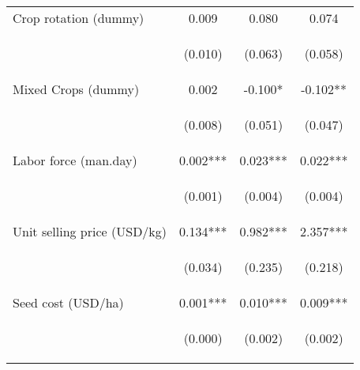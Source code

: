 \begin{center}
\begin{tabular}{lccc}
Crop rotation (dummy) & 0.009 & 0.080 & 0.074 \\
\vspace{4pt} & \begin{footnotesize}(0.010)\end{footnotesize} & \begin{footnotesize}(0.063)\end{footnotesize} & \begin{footnotesize}(0.058)\end{footnotesize} \\
Mixed Crops (dummy) & 0.002 & -0.100* & -0.102** \\
\vspace{4pt} & \begin{footnotesize}(0.008)\end{footnotesize} & \begin{footnotesize}(0.051)\end{footnotesize} & \begin{footnotesize}(0.047)\end{footnotesize} \\
Labor force (man.day) & 0.002*** & 0.023*** & 0.022*** \\
\vspace{4pt} & \begin{footnotesize}(0.001)\end{footnotesize} & \begin{footnotesize}(0.004)\end{footnotesize} & \begin{footnotesize}(0.004)\end{footnotesize} \\
Unit selling price (USD/kg) & 0.134*** & 0.982*** & 2.357*** \\
\vspace{4pt} & \begin{footnotesize}(0.034)\end{footnotesize} & \begin{footnotesize}(0.235)\end{footnotesize} & \begin{footnotesize}(0.218)\end{footnotesize} \\
Seed cost (USD/ha) & 0.001*** & 0.010*** & 0.009*** \\
\vspace{4pt} & \begin{footnotesize}(0.000)\end{footnotesize} & \begin{footnotesize}(0.002)\end{footnotesize} & \begin{footnotesize}(0.002)\end{footnotesize} \\

\end{tabular}
\end{center}
